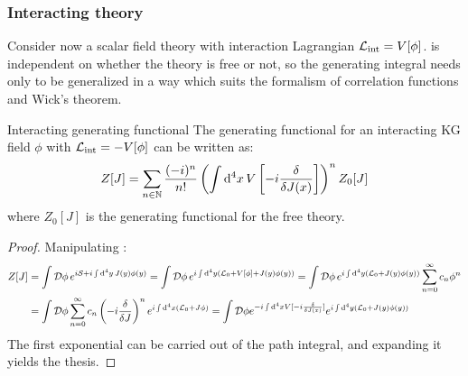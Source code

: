 \subsubsection{Interacting theory}

Consider now a scalar field theory with interaction Lagrangian $ \mathcal{L}_\text{int} = V[\phi] $.  is independent on whether the theory is free or not, so the generating integral needs only to be generalized in a way which suits the formalism of correlation functions and Wick's theorem.

\begin{proposition}{Interacting generating functional}{}
  The generating functional for an interacting KG field $ \phi $ with $ \mathcal{L}_\text{int} = - V[\phi] $ can be written as:
  \begin{equation}
    Z[J] = \sum_{n \in \mathbb{N}} \frac{(-i)^n}{n!} \left( \int \mathrm{d}^4x\, V \left[ -i \frac{\delta}{\delta J(x)} \right] \right)^n Z_0[J]
  \end{equation}
  where $ Z_0[J] $ is the generating functional for the free theory.
\end{proposition}

\begin{proofbox}
  \begin{proof}
    Manipulating :
    \begin{equation*}
      \begin{split}
        Z[J]
        & = \int \mathcal{D}\phi\, e^{i\mathcal{S} + i \int \mathrm{d}^4y\, J(y) \phi(y)} = \int \mathcal{D}\phi\, e^{i \int \mathrm{d}^4y \left( \mathcal{L}_0 + V[\phi] + J(y) \phi(y) \right)} = \int \mathcal{D}\phi\, e^{i \int \mathrm{d}^4y \left( \mathcal{L}_0 + J(y) \phi(y) \right)} \sum_{n = 0}^\infty c_n \phi^n \\
        & = \int \mathcal{D}\phi \sum_{n = 0}^\infty c_n \left( -i \frac{\delta}{\delta J} \right)^n e^{i \int \mathrm{d}^4x \left( \mathcal{L}_0 + J \phi \right)} = \int \mathcal{D} \phi e^{-i \int \mathrm{d}^4x V[-i \frac{\delta}{\delta J(x)}]} e^{i \int \mathrm{d}^4y \left( \mathcal{L}_0 + J(y) \phi(y) \right)}
      \end{split}
    \end{equation*}
    The first exponential can be carried out of the path integral, and expanding it yields the thesis.
  \end{proof}
\end{proofbox}


